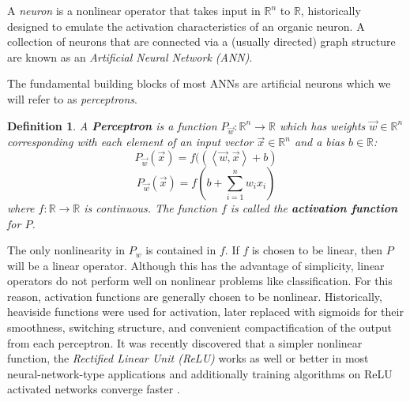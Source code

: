 \documentclass[10pt]{extarticle}
\newtheorem{definition}[theorem]{Definition}
\newcommand{\R}{\mathbb{R}}
\newcommand{\ip}[1]{\left\langle #1 \right\rangle}
\newcounter{col}
\begin{document}
A \emph{neuron} is a nonlinear operator that takes input in $\R^n$ to $\R$, historically designed to emulate the activation characteristics of an organic neuron. A collection of neurons that are connected via a (usually directed) graph structure are known as an \emph{Artificial Neural Network (ANN)}. 

The fundamental building blocks of most ANNs are artificial neurons which we will refer to as \emph{perceptrons}.

\begin{definition}{A \textbf{Perceptron} is  }
\label{perceptron}
a function $P_{\vec w}: \R^n \to \R$ which has \emph{weights} $\vec
w \in \R^n$ corresponding with each element of an input vector $\vec
x\in \R^n$ and a bias $b \in \R$:
\[P_{\vec w}(\vec x) = f(\left(\ip{\vec w,\vec x} + b\right)\]
\[P_{\vec w}(\vec x) = f\left(b + \sum_{i = 1}^n w_i x_i\right)\]
where $f: \R \to \R$ is continuous. The function $f$ is called the \textbf{activation function} for $P$. 
\end{definition}


The only nonlinearity in $P_w$ is contained in $f$. If $f$ is chosen to be linear, then $P$ will be a linear operator. Although this has the advantage of simplicity, linear operators do not perform well on nonlinear problems like classification. For this reason, activation functions are generally chosen to be nonlinear. Historically, heaviside functions were used for activation, later replaced with sigmoids \cite{malik1990preattentive} for their smoothness, switching structure, and convenient
compactification of the output from each perceptron.  It was recently discovered that a simpler nonlinear function, the \emph{Rectified Linear Unit (ReLU)} works as well or better in most neural-network-type applications \cite{glorot2011deep} and additionally training algorithms on ReLU activated networks converge faster \cite{nair_rectified_nodate}. 
\end{document}
